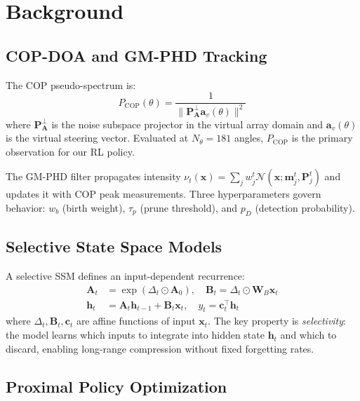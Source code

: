 \documentclass[conference]{IEEEtran}
\def\mat#1{\mathbf{#1}}
\def\vec#1{\mathbf{#1}}
\begin{document}
\section{Background}
\label{sec:background}

\subsection{COP-DOA and GM-PHD Tracking}

The COP pseudo-spectrum is:
\begin{equation}
  P_{\mathrm{COP}}(\theta) =
  \frac{1}{\|\mat{P}_{\mat{A}}^\perp \vec{a}_v(\theta)\|^2}
  \label{eq:cop_spectrum}
\end{equation}
where $\mat{P}_{\mat{A}}^\perp$ is the noise subspace projector
in the virtual array domain and $\vec{a}_v(\theta)$ is the
virtual steering vector.
Evaluated at $N_\theta{=}181$ angles, $P_{\mathrm{COP}}$ is the
primary observation for our RL policy.

The GM-PHD filter propagates intensity
$\nu_t(\vec{x}) = \sum_j w_j^t \mathcal{N}(\vec{x};\vec{m}_j^t,
\mat{P}_j^t)$ and updates it with COP peak measurements.
Three hyperparameters govern behavior:
$w_b$ (birth weight), $\tau_p$ (prune threshold),
and $p_D$ (detection probability).

\subsection{Selective State Space Models}

A selective SSM \cite{gu2023mamba} defines an input-dependent
recurrence:
\begin{align}
  \mat{A}_t &= \exp(\Delta_t \odot \mat{A}_0),\quad
  \mat{B}_t = \Delta_t \odot \mat{W}_B \vec{x}_t \\
  \vec{h}_t &= \mat{A}_t \vec{h}_{t-1} + \mat{B}_t \vec{x}_t,\quad
  y_t       = \vec{c}_t^\top \vec{h}_t
  \label{eq:ssm}
\end{align}
where $\Delta_t, \mat{B}_t, \vec{c}_t$ are affine functions of input
$\vec{x}_t$.
The key property is \emph{selectivity}: the model learns which
inputs to integrate into hidden state $\vec{h}_t$ and which to
discard, enabling long-range compression without fixed forgetting
rates.

\subsection{Proximal Policy Optimization}
\end{document}
